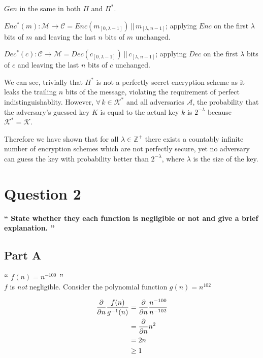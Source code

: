 \documentclass{article}
\newcommand{\HomeworkText}[1]{\textbf{``#1''}\\}
\begin{document}
    $Gen$ in the same in both $\Pi$ and $\Pi^{*}$. 
    
    $Enc^{*}(m) : \mathcal{M} \to \mathcal{C} = Enc(m_{[0,\lambda-1]}) \,||\, m_{[\lambda,n-1]}$; applying $Enc$ on the first $\lambda$ bits of $m$ and leaving the last $n$ bits of $m$ unchanged. 
    
    $Dec^{*}(c) : \mathcal{C} \to \mathcal{M} = Dec(c_{[0,\lambda-1]}) \,||\, c_{[\lambda,n-1]}$; applying $Dec$ on the first $\lambda$ bits of $c$ and leaving the last $n$ bits of $c$ unchanged.
    
    We can see, trivially that $\Pi^{*}$ is not a perfectly secret encryption scheme as it leaks the trailing $n$ bits of the message, violating the requirement of perfect indistinguishablity. However, $\forall\, k \in \mathcal{K}^{*}$ and all adversaries $\mathcal{A}$, the probability that the adversary's guessed key $K$ is equal to the actual key $k$ is $2^{-\lambda}$ because $\mathcal{K}^{*} = \mathcal{K}$. 
    
    Therefore we have shown that for all $\lambda \in \mathbb{Z}^{+}$ there exists a countably infinite number of encryption schemes which are not perfectly secure, yet no adversary can guess the key with probability better than $2^{-\lambda}$, where $\lambda$ is the size of the key.


	\clearpage
	\section*{Question 2}
	\HomeworkText{
		State whether they each function is negligible or not and give a brief explanation.
	}

	\subsection*{Part A}
	\HomeworkText{
		$f(n) = n^{-100}$
	}

	$f$ is \emph{not} negligible. Consider the polynomial function $g(n) = n^{102}$
	
	\begin{equation}
	\begin{split}
	\pdv{}{n} \frac{f(n)}{g^{-1}(n)} & = \pdv{}{n} \frac{n^{-100}}{n^{-102}} \\
	  & = \pdv{}{n} n^2 \\
	  & = 2n \\
	  & \ge 1
	\end{split}
	\end{equation}
	
\end{document}
